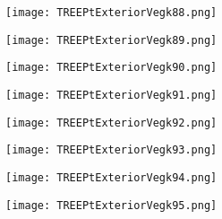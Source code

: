 \documentclass[pdf]{beamer}
\begin{document}
\begin{frame}
\begin{figure}[!h]
\centering
\texttt{[image: TREEPtExteriorVegk88.png]}
\end{figure}
\end{frame}

\begin{frame}
\begin{figure}[!h]
\centering
\texttt{[image: TREEPtExteriorVegk89.png]}
\end{figure}
\end{frame}

\begin{frame}
\begin{figure}[!h]
\centering
\texttt{[image: TREEPtExteriorVegk90.png]}
\end{figure}
\end{frame}

\begin{frame}
\begin{figure}[!h]
\centering
\texttt{[image: TREEPtExteriorVegk91.png]}
\end{figure}
\end{frame}

\begin{frame}
\begin{figure}[!h]
\centering
\texttt{[image: TREEPtExteriorVegk92.png]}
\end{figure}
\end{frame}

\begin{frame}
\begin{figure}[!h]
\centering
\texttt{[image: TREEPtExteriorVegk93.png]}
\end{figure}
\end{frame}

\begin{frame}
\begin{figure}[!h]
\centering
\texttt{[image: TREEPtExteriorVegk94.png]}
\end{figure}
\end{frame}

\begin{frame}
\begin{figure}[!h]
\centering
\texttt{[image: TREEPtExteriorVegk95.png]}
\end{figure}
\end{frame}
\end{document}
